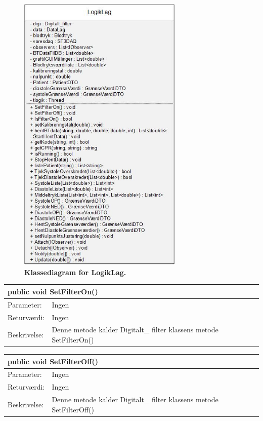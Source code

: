 \begin{figure}[H]
\includegraphics[width =0.7\textwidth , center]{billeder/klassediagramLogik}
\caption{\textbf{Klassediagram for LogikLag.}}
\end{figure}
\begin{table}[H]
\label{tab:tabel2}
\begin{tabular}{| l | p{13cm} |}
   \hline
   \multicolumn{2}{|l|}{public void SetFilterOn()} \\ \hline
   Parameter: & Ingen\\ \hline
   Returværdi: & Ingen\\ \hline
   Beskrivelse: & Denne metode kalder Digitalt\_ filter klassens metode SetFilterOn() \\ \hline
\end{tabular}
\end{table}
\begin{table}[H]
\label{tab:tabel2}
\begin{tabular}{| l | p{13cm} |}
   \hline
   \multicolumn{2}{|l|}{public void SetFilterOff()} \\ \hline
   Parameter: & Ingen\\ \hline
   Returværdi: & Ingen\\ \hline
   Beskrivelse: & Denne metode kalder Digitalt\_ filter klassens metode SetFilterOff() \\ \hline
\end{tabular}
\end{table}
